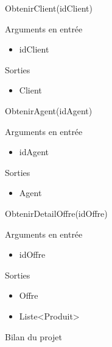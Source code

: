 \documentclass[xetex]{beamer}
\begin{document}
\begin{frame}{ObtenirClient(idClient)}

\noindent  Arguments en entrée
\begin{itemize}
\item idClient \\
\end{itemize}


\noindent Sorties
\begin{itemize}
\item Client
\end{itemize}

\end{frame}

\begin{frame}{ObtenirAgent(idAgent)}

\noindent  Arguments en entrée
\begin{itemize}
\item idAgent \\ 
\end{itemize}

\noindent Sorties
\begin{itemize}
\item Agent 
\end{itemize} 

\end{frame}

\begin{frame}{ObtenirDetailOffre(idOffre)}

\noindent  Arguments en entrée 
\begin{itemize}
\item idOffre \\
\end{itemize} 

\noindent Sorties
\begin{itemize}
\item Offre 
\item Liste<Produit>  
\end{itemize} 

\end{frame}
    
\begin{frame}{Bilan du projet}
  \begin{figure}
	
  \end{figure}
\end{frame}
\end{document}
